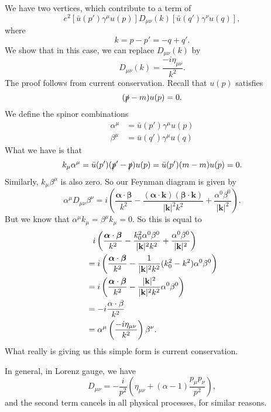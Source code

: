 \documentclass[a4paper]{article}
\begin{document}
\begin{eg}
\begin{center}
  \end{center}
  We have two vertices, which contribute to a term of
  \[
    e^2 [\bar{u}(p') \gamma^\mu u(p)] D_{\mu\nu}(k)[\bar{u}(q') \gamma^\nu u(q)],
  \]
  where
  \[
    k = p - p' = -q + q'.
  \]
  We show that in this case, we can replace $D_{\mu\nu}(k)$ by
  \[
    D_{\mu\nu}(k) = \frac{-i \eta_{\mu\nu}}{k^2}.
  \]
  The proof follows from current conservation. Recall that $u(p)$ satisfies
  \[
    (\slashed p - m) u(p) = 0.
  \]
  We define the spinor combinations
  \begin{align*}
    \alpha^\mu &= \bar{u}(p') \gamma^\mu u(p)\\
    \beta^\mu &= \bar{u}(q') \gamma^\mu u(q)
  \end{align*}
  What we have is that
  \[
    k_\mu \alpha^\mu = \bar{u} (p')(\slashed p' - \slashed p) u(p) = \bar{u}(p')(m - m) u(p) = 0.
  \]
  Similarly, $k_\mu \beta^\mu$ is also zero. So our Feynman diagram is given by
  \[
    \alpha^\mu D_{\mu\nu} \beta^\nu = i\left(\frac{\boldsymbol\alpha \cdot \boldsymbol\beta}{k^2} - \frac{(\boldsymbol\alpha\cdot \mathbf{k})(\boldsymbol\beta \cdot \mathbf{k})}{|\mathbf{k}|^2 k^2} + \frac{\alpha^0 \beta^0}{|\mathbf{k}|^2}\right).
  \]
  But we know that $\alpha^\mu k_\mu = \beta^\mu k_\mu = 0$. So this is equal to
  \begin{align*}
    &\hphantom{=}i\left(\frac{\boldsymbol\alpha \cdot \boldsymbol\beta}{k^2} - \frac{k_0^2 \alpha^0 \beta^0}{|\mathbf{k}|^2 k^2} + \frac{\alpha^0 \beta^0}{|\mathbf{k}|^2}\right)\\
    &= i\left(\frac{\boldsymbol \alpha\cdot \boldsymbol\beta}{k^2} - \frac{1}{|\mathbf{k}|^2 k^2}(k_0^2 - k^2) \alpha^0 \beta^0\right)\\
    &= i\left(\frac{\boldsymbol \alpha\cdot \boldsymbol\beta}{k^2} - \frac{|\mathbf{k}|^2}{|\mathbf{k}|^2 k^2} \alpha^0 \beta^0\right)\\
    &= -i \frac{\alpha \cdot \beta}{k^2} \\
    &= \alpha^\mu \left(\frac{-i \eta_{\mu\nu}}{k^2}\right)\beta^\nu.
  \end{align*}
  What really is giving us this simple form is current conservation.
\end{eg}
In general, in Lorenz gauge, we have
\[
  D_{\mu\nu} = -\frac{i}{p^2} \left(\eta_{\mu\nu} + (\alpha - 1) \frac{p_\mu p_\nu}{p^2}\right),
\]
and the second term cancels in all physical processes, for similar reasons.
\end{document}
